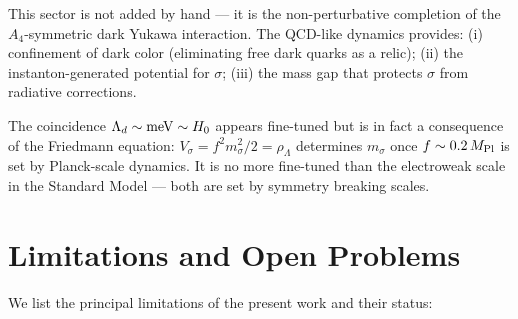 This sector is not added by hand — it is the non-perturbative completion of
the $A_4$-symmetric dark Yukawa interaction. The QCD-like dynamics provides:
(i) confinement of dark color (eliminating free dark quarks as a relic);
(ii) the instanton-generated potential for $\sigma$;
(iii) the mass gap that protects $\sigma$ from radiative corrections.

The coincidence $\Lambda_d \sim {\rm meV} \sim H_0$ appears fine-tuned but is
in fact a consequence of the Friedmann equation: $V_\sigma = f^2 m_\sigma^2/2 = \rho_\Lambda$
determines $m_\sigma$ once $f \sim 0.2\,M_{\rm Pl}$ is set by Planck-scale dynamics.
It is no more fine-tuned than the electroweak scale in the Standard Model — both
are set by symmetry breaking scales.


\section{Limitations and Open Problems}
\label{disc:limitations}

We list the principal limitations of the present work and their status:

